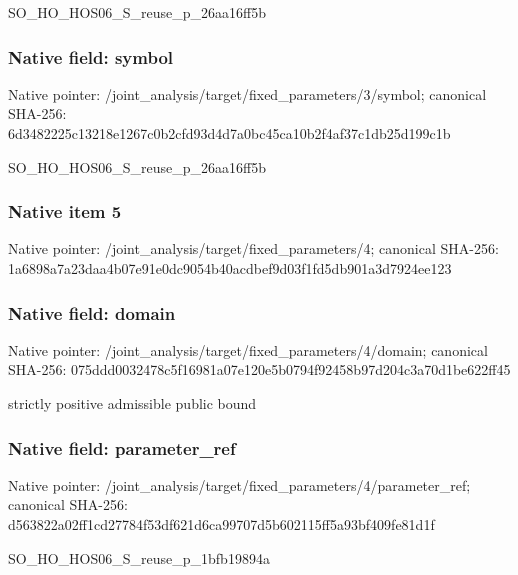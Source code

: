 \documentclass[10pt,a4paper]{article}
\begin{document}
\begingroup\raggedright\sloppy SO\_\allowbreak{}HO\_\allowbreak{}HOS06\_\allowbreak{}S\_\allowbreak{}reuse\_\allowbreak{}p\_\allowbreak{}26aa16ff5b\par\endgroup

\subsubsection{Native field: symbol}
Native pointer: /joint\_\allowbreak{}analysis/target/fixed\_\allowbreak{}parameters/3/symbol; canonical SHA-256: 6d3482225c13218e1267c0b2cfd93d4d7a0bc45ca10b2f4af37c1db25d199c1b

\begingroup\raggedright\sloppy SO\_\allowbreak{}HO\_\allowbreak{}HOS06\_\allowbreak{}S\_\allowbreak{}reuse\_\allowbreak{}p\_\allowbreak{}26aa16ff5b\par\endgroup

\subsubsection{Native item 5}
Native pointer: /joint\_\allowbreak{}analysis/target/fixed\_\allowbreak{}parameters/4; canonical SHA-256: 1a6898a7a23daa4b07e91e0dc9054b40acdbef9d03f1fd5db901a3d7924ee123

\subsubsection{Native field: domain}
Native pointer: /joint\_\allowbreak{}analysis/target/fixed\_\allowbreak{}parameters/4/domain; canonical SHA-256: 075ddd0032478c5f16981a07e120e5b0794f92458b97d204c3a70d1be622ff45

\begingroup\raggedright\sloppy strictly positive admissible public bound\par\endgroup

\subsubsection{Native field: parameter\_\allowbreak{}ref}
Native pointer: /joint\_\allowbreak{}analysis/target/fixed\_\allowbreak{}parameters/4/parameter\_\allowbreak{}ref; canonical SHA-256: d563822a02ff1cd27784f53df621d6ca99707d5b602115ff5a93bf409fe81d1f

\begingroup\raggedright\sloppy SO\_\allowbreak{}HO\_\allowbreak{}HOS06\_\allowbreak{}S\_\allowbreak{}reuse\_\allowbreak{}p\_\allowbreak{}1bfb19894a\par\endgroup
\end{document}
